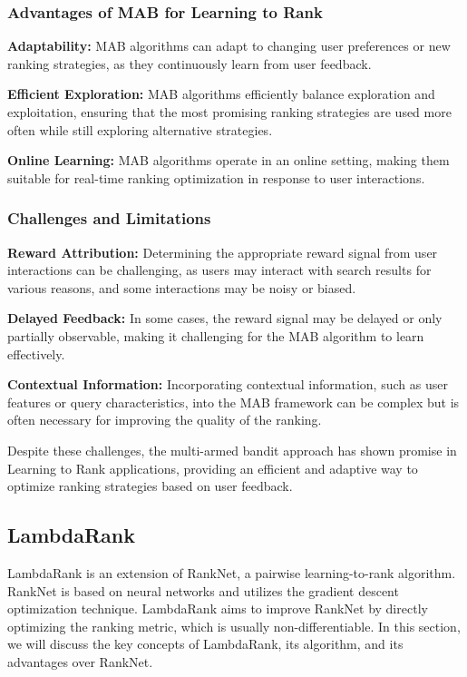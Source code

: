 \documentclass[12pt]{article}
\begin{document}
\subsubsection{Advantages of MAB for Learning to Rank}

\textbf{Adaptability:} MAB algorithms can adapt to changing user preferences or new ranking strategies, as they continuously learn from user feedback.

\textbf{Efficient Exploration:} MAB algorithms efficiently balance exploration and exploitation, ensuring that the most promising ranking strategies are used more often while still exploring alternative strategies.

\textbf{Online Learning:} MAB algorithms operate in an online setting, making them suitable for real-time ranking optimization in response to user interactions.

\subsubsection{Challenges and Limitations}

\textbf{Reward Attribution:} Determining the appropriate reward signal from user interactions can be challenging, as users may interact with search results for various reasons, and some interactions may be noisy or biased.

\textbf{Delayed Feedback:} In some cases, the reward signal may be delayed or only partially observable, making it challenging for the MAB algorithm to learn effectively.

\textbf{Contextual Information:} Incorporating contextual information, such as user features or query characteristics, into the MAB framework can be complex but is often necessary for improving the quality of the ranking.

Despite these challenges, the multi-armed bandit approach has shown promise in Learning to Rank applications, providing an efficient and adaptive way to optimize ranking strategies based on user feedback.

\subsection{LambdaRank}

LambdaRank is an extension of RankNet, a pairwise learning-to-rank algorithm. RankNet is based on neural networks and utilizes the gradient descent optimization technique. LambdaRank aims to improve RankNet by directly optimizing the ranking metric, which is usually non-differentiable. In this section, we will discuss the key concepts of LambdaRank, its algorithm, and its advantages over RankNet.
\end{document}

